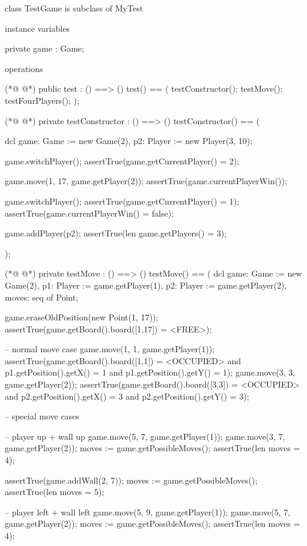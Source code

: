 \begin{vdmpp}[breaklines=true]
class TestGame is subclass of MyTest

instance variables

 private game : Game;
 
operations

(*@
\label{test:9}
@*)
 public test : () ==> ()
 test() ==
 (
  testConstructor();
  testMove();
  testFourPlayers();
 );
 
(*@
\label{testConstructor:17}
@*)
 private testConstructor : () ==> ()
 testConstructor() ==
 (
  
  dcl
  game: Game := new Game(2),
  p2: Player := new Player(3, 10);
  
  game.switchPlayer();
  assertTrue(game.getCurrentPlayer() = 2);
  
  game.move(1, 17, game.getPlayer(2));
  assertTrue(game.currentPlayerWin());
  
  game.switchPlayer();
  assertTrue(game.getCurrentPlayer() = 1);
  assertTrue(game.currentPlayerWin() = false);
  
  game.addPlayer(p2);
  assertTrue(len game.getPlayers() = 3);
  
 );
 
(*@
\label{testMove:40}
@*)
 private testMove : () ==> ()
 testMove() ==
 (
  dcl 
  game: Game := new Game(2),
  p1: Player := game.getPlayer(1),
  p2: Player := game.getPlayer(2),
  moves: seq of Point;
  
  game.eraseOldPosition(new Point(1, 17));
  assertTrue(game.getBoard().board([1,17]) = <FREE>);
  
  -- normal move case
  game.move(1, 1, game.getPlayer(1));
  assertTrue(game.getBoard().board([1,1]) = <OCCUPIED> and p1.getPosition().getX() = 1 and p1.getPosition().getY() = 1);
  game.move(3, 3, game.getPlayer(2));
  assertTrue(game.getBoard().board([3,3]) = <OCCUPIED> and p2.getPosition().getX() = 3 and p2.getPosition().getY() = 3);
  
  -- special move cases
  
  -- player up + wall up
  game.move(5, 7, game.getPlayer(1));
  game.move(3, 7, game.getPlayer(2));
  moves := game.getPossibleMoves();
  assertTrue(len moves = 4);
  
  assertTrue(game.addWall(2, 7));
  moves := game.getPossibleMoves();
  assertTrue(len moves = 5);
  
  -- player left + wall left
  game.move(5, 9, game.getPlayer(1));
  game.move(5, 7, game.getPlayer(2));
  moves := game.getPossibleMoves();
  assertTrue(len moves = 4);
  

\end{vdmpp}

